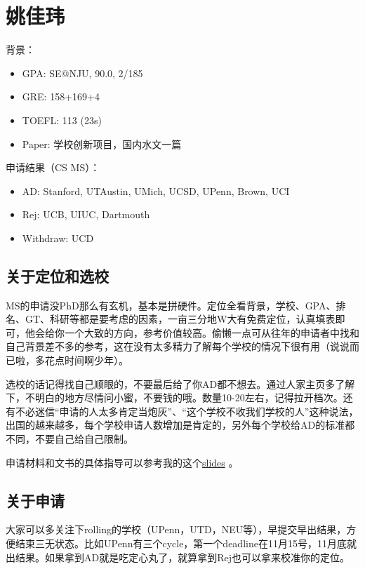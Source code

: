 \section{姚佳玮}

背景：
\begin{itemize}
\item GPA: SE@NJU, 90.0, 2/185
\item GRE: 158+169+4
\item TOEFL: 113 (23s)
\item Paper: 学校创新项目，国内水文一篇
\end{itemize}
\par
申请结果（CS MS）：
\begin{itemize}
\item AD: Stanford, UTAustin, UMich, UCSD, UPenn, Brown, UCI
\item Rej: UCB, UIUC, Dartmouth
\item Withdraw: UCD
\end{itemize}
\par
\subsection{关于定位和选校}

MS的申请没PhD那么有玄机，基本是拼硬件。定位全看背景，学校、GPA、排名、GT、科研等都是要考虑的因素，一亩三分地W大有免费定位，认真填表即可，他会给你一个大致的方向，参考价值较高。偷懒一点可从往年的申请者中找和自己背景差不多的参考，这在没有太多精力了解每个学校的情况下很有用（说说而已啦，多花点时间啊少年）。\par

选校的话记得找自己顺眼的，不要最后给了你AD都不想去。通过人家主页多了解下，不明白的地方尽情问小蜜，不要钱的哦。数量10-20左右，记得拉开档次。还有不必迷信“申请的人太多肯定当炮灰”、“这个学校不收我们学校的人”这种说法，出国的越来越多，每个学校申请人数增加是肯定的，另外每个学校给AD的标准都不同，不要自己给自己限制。\par

申请材料和文书的具体指导可以参考我的这个\href{http://d.pr/f/UgYx}{slides} 。

\subsection{关于申请}

大家可以多关注下rolling的学校（UPenn，UTD，NEU等），早提交早出结果，方便结束三无状态。比如UPenn有三个cycle，第一个deadline在11月15号，11月底就出结果。如果拿到AD就是吃定心丸了，就算拿到Rej也可以拿来校准你的定位。\par

